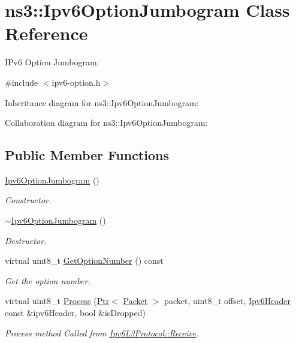 \hypertarget{classns3_1_1Ipv6OptionJumbogram}{}\section{ns3\+:\+:Ipv6\+Option\+Jumbogram Class Reference}
\label{classns3_1_1Ipv6OptionJumbogram}


I\+Pv6 Option Jumbogram.  




{\ttfamily \#include $<$ipv6-\/option.\+h$>$}



Inheritance diagram for ns3\+:\+:Ipv6\+Option\+Jumbogram\+:


Collaboration diagram for ns3\+:\+:Ipv6\+Option\+Jumbogram\+:
\subsection*{Public Member Functions}
\begin{DoxyCompactItemize}
\item 
\hyperlink{classns3_1_1Ipv6OptionJumbogram_ae31e8ff9832b0f6b34a33bb7ba98b7fc}{Ipv6\+Option\+Jumbogram} ()
\begin{DoxyCompactList}\small\item\em Constructor. \end{DoxyCompactList}\item 
\hyperlink{classns3_1_1Ipv6OptionJumbogram_aa5ec0a4626377c5a1ea5118616c0bcf5}{$\sim$\+Ipv6\+Option\+Jumbogram} ()
\begin{DoxyCompactList}\small\item\em Destructor. \end{DoxyCompactList}\item 
virtual uint8\+\_\+t \hyperlink{classns3_1_1Ipv6OptionJumbogram_aa02a6127114b58b5cca094a55bec8f5c}{Get\+Option\+Number} () const 
\begin{DoxyCompactList}\small\item\em Get the option number. \end{DoxyCompactList}\item 
virtual uint8\+\_\+t \hyperlink{classns3_1_1Ipv6OptionJumbogram_a84c5f9b9510c32aea09e418b2dad9721}{Process} (\hyperlink{classns3_1_1Ptr}{Ptr}$<$ \hyperlink{classns3_1_1Packet}{Packet} $>$ packet, uint8\+\_\+t offset, \hyperlink{classns3_1_1Ipv6Header}{Ipv6\+Header} const \&ipv6\+Header, bool \&is\+Dropped)
\begin{DoxyCompactList}\small\item\em Process method Called from \hyperlink{classns3_1_1Ipv6L3Protocol_a8a95d576e8aee9a571db93bf686d850a}{Ipv6\+L3\+Protocol\+::\+Receive}. \end{DoxyCompactList}\end{DoxyCompactItemize}

